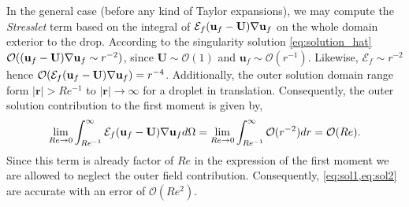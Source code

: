 In the general case (before any kind of Taylor expansions), we may compute the \textit{Stresslet} term based on the integral of $\mathcal{E}_f (\textbf{u}_f - \textbf{U})\mathbf{\nabla} \textbf{u}_f$ on the whole domain exterior to the drop. 
According to the singularity solution \eqref{eq:solution_hat} $\mathcal{O}((\textbf{u}_f - \textbf{U})\mathbf{\nabla} \textbf{u}_f \sim r^{-2})$, since $\textbf{U} \sim \mathcal{O}(1)$ and $\textbf{u}_f\sim \mathcal{O}(r^{-1})$. 
Likewise, $\mathcal{E}_f \sim r^{-2}$ hence $\mathcal{O}(\mathcal{E}_f (\textbf{u}_f - \textbf{U})\mathbf{\nabla} \textbf{u}_f) = r^{-4}$. 
Additionally, the outer solution domain range form $|\textbf{r}| > Re^{-1}$ to $|\textbf{r}|\to \infty$ for a droplet in translation\citet{proudman1957expansions}.
Consequently, the outer solution contribution to the first moment is given by\citep{stone2001inertial}, 
\begin{equation}
    \lim_{Re \to 0 }
    \int_{Re^{-1}}^\infty
    \mathcal{E}_f (\textbf{u}_f - \textbf{U})\mathbf{\nabla} \textbf{u}_f
    d\Omega
    =
    \lim_{Re \to 0 }
    \int_{Re^{-1}}^\infty
    \mathcal{O}(r^{-2})
    dr
    = \mathcal{O}(Re). 
\end{equation}
Since this term is already factor of $Re$ in the expression of the first moment we are allowed to neglect the outer field contribution. 
Consequently, \ref{eq:sol1,eq:sol2} are accurate with an error of $\mathcal{O}(Re^2)$. 